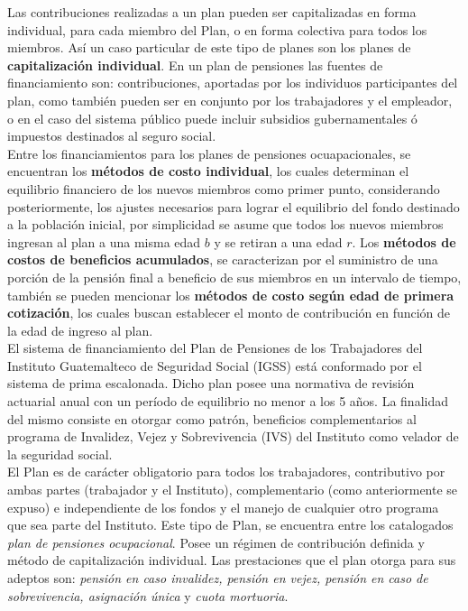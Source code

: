 \documentclass[12pt,letterpaper,titlepage]{article}
\begin{document}
{Las contribuciones realizadas a un plan pueden ser capitalizadas en forma individual, para  cada miembro del Plan, o en forma colectiva para todos los miembros. Así un caso particular de este tipo de planes son los planes de \textbf{capitalización individual}. En un plan de pensiones las fuentes de financiamiento son:  contribuciones, aportadas por los individuos participantes del plan, como también pueden ser en conjunto por los trabajadores y el empleador, o en el caso del sistema público puede incluir subsidios gubernamentales ó impuestos destinados al seguro social.\\


 Entre los financiamientos para los planes de pensiones ocuapacionales, se encuentran los \textbf{métodos de costo individual}, los cuales determinan el equilibrio financiero de los nuevos miembros como primer punto, considerando posteriormente, los ajustes necesarios para lograr el equilibrio del fondo destinado a la población inicial, por simplicidad se asume que todos los nuevos miembros ingresan al plan a una misma edad $b$ y se retiran a una edad $r$. Los \textbf{métodos de costos de beneficios acumulados}, se caracterizan por el suministro de una porción de la pensión final a beneficio de sus miembros en un intervalo de tiempo, también se pueden mencionar los \textbf{métodos de costo según edad de primera cotización}, los cuales buscan establecer el monto de contribución en función de la edad de ingreso al plan.\\
 

El sistema de financiamiento del Plan de Pensiones de los Trabajadores del Instituto Guatemalteco de Seguridad Social (IGSS) está conformado por el sistema de prima escalonada. Dicho plan posee una normativa de revisión actuarial anual con un período de equilibrio no menor a los 5 años. La finalidad del mismo consiste en otorgar como patrón, beneficios complementarios al programa de Invalidez, Vejez y Sobrevivencia (IVS) del Instituto como velador de la seguridad social. \\

El Plan es de carácter obligatorio para todos los trabajadores, contributivo por ambas partes (trabajador y el Instituto), complementario (como anteriormente se expuso) e independiente de los fondos y el manejo de cualquier otro programa que sea parte del Instituto. Este tipo de Plan, se encuentra entre los catalogados \textit{plan de pensiones ocupacional}. Posee un régimen de contribución definida y método de capitalización individual. Las prestaciones que el plan otorga para sus adeptos son: \textit{pensión en caso invalidez, pensión en vejez, pensión en caso de sobrevivencia, asignación única} y \textit{cuota mortuoria}.

}
\end{document}
